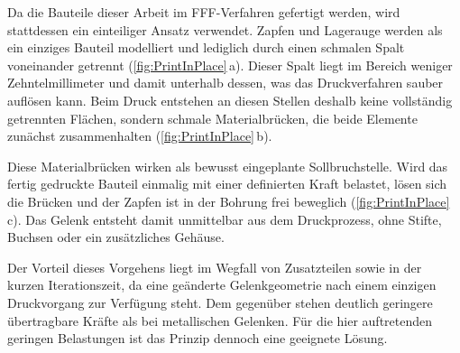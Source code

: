 Da die Bauteile dieser Arbeit im FFF-Verfahren gefertigt werden, wird stattdessen ein einteiliger Ansatz verwendet. Zapfen
und Lagerauge werden als ein einziges Bauteil modelliert und lediglich durch einen schmalen Spalt voneinander getrennt (\cref{fig:PrintInPlace}\,a).
Dieser Spalt liegt im Bereich weniger Zehntelmillimeter und damit unterhalb dessen, was das Druckverfahren sauber auflösen kann.
Beim Druck entstehen an diesen Stellen deshalb keine vollständig getrennten Flächen, sondern schmale Materialbrücken,
die beide Elemente zunächst zusammenhalten (\cref{fig:PrintInPlace}\,b).

Diese Materialbrücken wirken als bewusst eingeplante Sollbruchstelle. Wird das fertig gedruckte Bauteil einmalig mit einer
definierten Kraft belastet, lösen sich die Brücken und der Zapfen ist in der Bohrung frei beweglich (\cref{fig:PrintInPlace}\,c).
Das Gelenk entsteht damit unmittelbar aus dem Druckprozess, ohne Stifte, Buchsen oder ein zusätzliches Gehäuse.

Der Vorteil dieses Vorgehens liegt im Wegfall von Zusatzteilen sowie in der kurzen Iterationszeit, da eine geänderte
Gelenkgeometrie nach einem einzigen Druckvorgang zur Verfügung steht. Dem gegenüber stehen deutlich geringere
übertragbare Kräfte als bei metallischen Gelenken. Für die hier auftretenden geringen Belastungen ist das Prinzip
dennoch eine geeignete Lösung.


